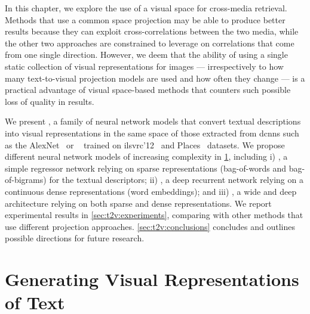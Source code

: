 In this chapter, we explore the use of a visual space for cross-media retrieval.
Methods that use a common space projection may be able to produce better results because they can exploit cross-correlations between the two media, while the other two approaches are constrained to leverage on correlations that come from one single direction.
However, we deem that the ability of using a single static collection of visual representations for images --- irrespectively to how many text-to-visual projection models are used and how often they change --- is a practical advantage of visual space-based methods that counters such possible loss of quality in results.

We present %
\ttv{}, a family of neural network models that convert textual descriptions into visual representations in the same space of those extracted from \glspl{dcnn} such as the AlexNet~\cite{krizhevsky2012imagenet} or \resnet{}~\cite{he2016deep} trained on \gls{ilsvrc}'12~\cite{russakovsky2015imagenet} and Places~\cite{zhou2014learning} datasets.
We propose different neural network models of increasing complexity in \ref{sec:t2v:method}, including i) \sparsettv{}, a simple regressor network relying on sparse representations (bag-of-words and bag-of-bigrams) for the textual descriptors; ii) \densettv{}, a deep recurrent network relying on a continuous dense representations (word embeddings); and iii) \widedeepttv{}, a wide and deep architecture relying on both sparse and dense representations.
We report experimental results in \ref{sec:t2v:experiments}, comparing with other methods that use different projection approaches.
\ref{sec:t2v:conclusions} concludes and outlines possible directions for future research.

\section{Generating Visual Representations of Text}
\label{sec:t2v:method}

